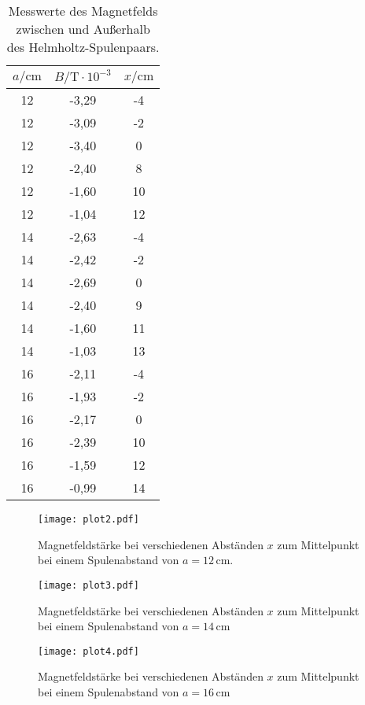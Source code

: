 \begin{table}
  \centering
  \caption{Messwerte des Magnetfelds zwischen und Außerhalb des Helmholtz-Spulenpaars.}
  \label{tab:Helm}
  \begin{tabular}{c c c}
    \toprule
    $a/\unit{\cm}$ & $B/\unit{\tesla} \cdot 10^{-3}$ & $x/\unit{\cm}$ \\
    \midrule
    12 & -3,29 & -4 \\
    12 & -3,09 & -2 \\
    12 & -3,40 & 0 \\
    12 & -2,40 & 8 \\
    12 & -1,60 & 10 \\
    12 & -1,04 & 12 \\
    14 & -2,63 & -4 \\
    14 & -2,42 & -2 \\
    14 & -2,69 & 0 \\
    14 & -2,40 & 9 \\
    14 & -1,60 & 11 \\
    14 & -1,03 & 13 \\
    16 & -2,11 & -4 \\
    16 & -1,93 & -2 \\
    16 & -2,17 & 0 \\
    16 & -2,39 & 10 \\
    16 & -1,59 & 12 \\
    16 & -0,99 & 14 \\
    \bottomrule
  \end{tabular}
\end{table}

\begin{figure}
  \centering
  \texttt{[image: plot2.pdf]}
  \caption{Magnetfeldstärke bei verschiedenen Abständen $x$ zum Mittelpunkt bei einem 
  Spulenabstand von $a=12 \, \unit{\cm}$.}
  \label{fig:Helm12}
\end{figure}

\begin{figure}
  \centering
  \texttt{[image: plot3.pdf]}
  \caption{Magnetfeldstärke bei verschiedenen Abständen $x$ zum Mittelpunkt bei einem 
  Spulenabstand von $a=14 \, \unit{\cm}$}
  \label{fig:Helm14}
\end{figure}

\begin{figure}
  \centering
  \texttt{[image: plot4.pdf]}
  \caption{Magnetfeldstärke bei verschiedenen Abständen $x$ zum Mittelpunkt bei einem 
  Spulenabstand von $a=16 \, \unit{\cm}$}
  \label{fig:Helm16}
\end{figure}

